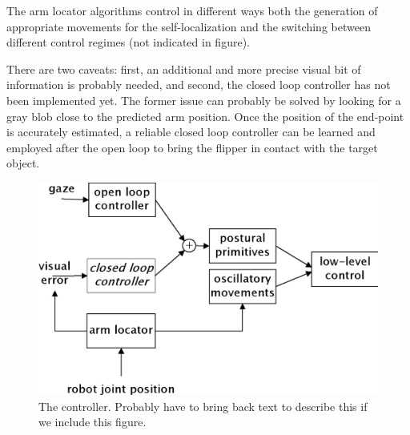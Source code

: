 The arm locator algorithms control in different ways both the
generation of appropriate movements for the self-localization and the
switching between different control regimes (not indicated in figure).

There are two caveats: first, an additional and more precise visual
bit of information is probably needed, and second, the closed loop
controller has not been implemented yet. The former issue can probably
be solved by looking for a gray blob close to the predicted arm
position. Once the position of the end-point is accurately estimated,
a reliable closed loop controller can be learned and employed after the
open loop to bring the flipper in contact with the target object.
\fi

\ifverbose
\begin{figure}[tbh]
\begin{center}
\includegraphics[width=\columnwidth]{control-flow.eps}
\caption{ 
%
  The controller.  Probably have to bring back text to describe this
  if we include this figure.
%
}
\label{fig:control-flow}
\end{center}
\end{figure}
\fi

